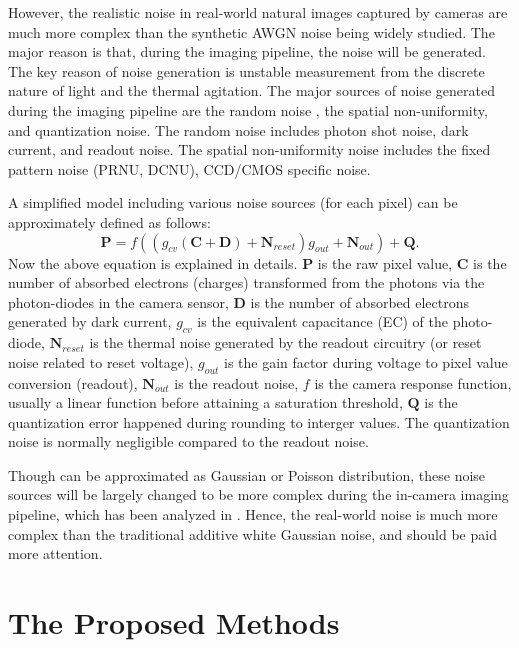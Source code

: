 However, the realistic noise in real-world natural images captured by cameras are much more complex than the synthetic AWGN noise being widely studied. The major reason is that, during the imaging pipeline, the noise will be generated. The key reason of noise generation is unstable measurement from the discrete nature of light and the thermal agitation. The major sources of noise generated during the imaging pipeline are the random noise , the spatial non-uniformity, and quantization noise. The random noise includes photon shot noise, dark current, and readout noise. The spatial non-uniformity noise includes the fixed pattern noise (PRNU, DCNU), CCD/CMOS specific noise. 


A simplified model including various noise sources (for each pixel) can be approximately defined as follows:
\begin{equation}
\bm{P} = f((g_{cv}(\bm{C}+\bm{D})+\bm{N}_{reset})g_{out}+\bm{N}_{out})+\bm{Q}.
\end{equation}
Now the above equation is explained in details. 
$\bm{P}$ is the raw pixel value, 
$\bm{C}$ is the number of absorbed electrons (charges) transformed from the photons via the photon-diodes in the camera sensor,
$\bm{D}$ is the number of absorbed electrons generated by dark current,
$g_{cv}$ is the equivalent capacitance (EC) of the photo-diode,
$\bm{N}_{reset}$ is the thermal noise generated by the readout circuitry (or reset noise related to reset voltage),
$g_{out}$ is the gain factor during voltage to pixel value conversion (readout),
$\bm{N}_{out}$ is the readout noise,
$f$ is the camera response function, usually a linear function before attaining a saturation threshold,
$\bm{Q}$ is the quantization error happened during rounding to interger values. The quantization noise is normally negligible compared to the readout noise.

Though can be approximated as Gaussian or Poisson distribution, these noise sources will be largely changed to be more complex during the in-camera imaging pipeline, which has been analyzed in \cite{crosschannel}. Hence, the real-world noise is much more complex than the traditional additive white Gaussian noise, and should be paid more attention.


\section{The Proposed Methods}
\label{sec:intro:new}

